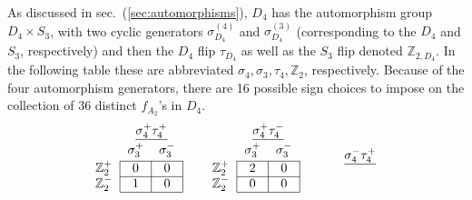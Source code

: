\documentclass[11pt]{article}
\begin{document}
As discussed in sec.~(\ref{sec:automorphisms}), $D_4$ has the automorphism group $D_4\times S_3$, with two cyclic generators $\sigma_{D_4}^{(4)}$ and $\sigma_{D_4}^{(3)}$ (corresponding to the $D_4$ and $S_3$, respectively) and then the $D_4$ flip $\tau_{D_4}$ as well as the $S_3$ flip denoted $\mathbb{Z}_{2,D_4}$. In the following table these are abbreviated $\sigma_4,\sigma_3,\tau_4, \mathbb{Z}_2$, respectively. Because of the four automorphism generators, there are 16 possible sign choices to impose on the collection of 36 distinct $f_{A_2}$'s in $D_4$. 
\begin{equation}
\begin{tabular}{ c | c | c |}
\multicolumn{1}{c}{} &\multicolumn{2}{c}{$\underline{\sigma_4^+ \tau_4^+}$} \\[-1em]
\multicolumn{1}{c}{} & \multicolumn{1}{c}{} & \multicolumn{1}{c}{} \\
\multicolumn{1}{c}{} & \multicolumn{1}{c}{$\sigma_{3}^+$} & \multicolumn{1}{c}{$\sigma_{3}^-$} \\[-1em]
\multicolumn{1}{c}{} & \multicolumn{1}{c}{} & \multicolumn{1}{c}{} \\
\cline{2-3} $\mathbb{Z}_2^+$ & 0 & 0 \\
\cline{2-3} $\mathbb{Z}_2^-$ & 1 & 0 \\
\cline{2-3}
\end{tabular} 
\hspace{.6cm}
\begin{tabular}{ c | c | c |}
\multicolumn{1}{c}{} &\multicolumn{2}{c}{$\underline{\sigma_4^+ \tau_4^-}$} \\[-1em]
\multicolumn{1}{c}{} & \multicolumn{1}{c}{} & \multicolumn{1}{c}{}\\
\multicolumn{1}{c}{} & \multicolumn{1}{c}{$\sigma_{3}^+$} & \multicolumn{1}{c}{$\sigma_{3}^-$} \\[-1em]
\multicolumn{1}{c}{} & \multicolumn{1}{c}{} & \multicolumn{1}{c}{} \\
\cline{2-3} $\mathbb{Z}_2^+$ & 2 & 0 \\
\cline{2-3} $\mathbb{Z}_2^-$ & 0 & 0 \\
\cline{2-3}
\end{tabular}
\hspace{.6cm}
\begin{tabular}{ c | c | c |}
\multicolumn{1}{c}{} &\multicolumn{2}{c}{$\underline{\sigma_4^- \tau_4^+}$} \\[-1em]
\multicolumn{1}{c}{} & \multicolumn{1}{c}{} & \multicolumn{1}{c}{}\\

\end{tabular}
\end{equation}
\end{document}
